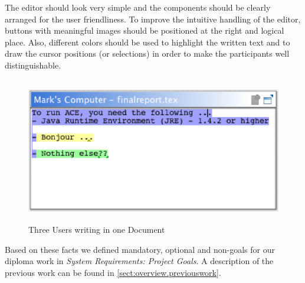 The editor should look very simple and the components should be clearly arranged for the user friendliness. To improve the intuitive handling of the editor, buttons with meaningful images should be positioned at the right and logical place. Also, different colors should be used to highlight the written text and to draw the cursor positions (or selections) in order to make the participants well distinguishable. \\

\begin{figure}[H]
\begin{center}
  \includegraphics[height=2.5in, width=5.12in]{../images/usermanual/editor_collab_3users.eps}
\caption{Three Users writing in one Document}
\end{center}
\end{figure}

Based on these facts we defined mandatory, optional and non-goals for our diploma work in \textit{System Requirements: Project Goals}. A description of the previous work can be found in \ref{sect:overview.previouswork}.
